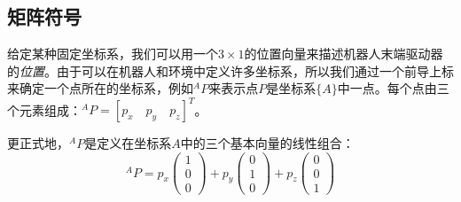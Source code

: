 \subsection{矩阵符号}


给定某种固定坐标系，我们可以用一个$3\times 1$的位置向量来描述机器人末端驱动器的\emph{位置}。由于可以在机器人和环境中定义许多坐标系，所以我们通过一个前导上标来确定一个点所在的坐标系，例如$^AP$来表示点$P$是坐标系$\{A\}$中一点。每个点由三个元素组成：$^AP=[p_x\quad p_y\quad p_z]^T$。

更正式地，$ ^ AP $是定义在坐标系$A$中的三个基本向量的线性组合：
\begin{equation}
^AP=p_x\left(\begin{array}{c}1\\0\\0\end{array}\right)+p_y\left(\begin{array}{c}0\\1\\0\end{array}\right)+p_z\left(\begin{array}{c}0\\0\\1\end{array}\right)\label{eq:basis}
\end{equation}



